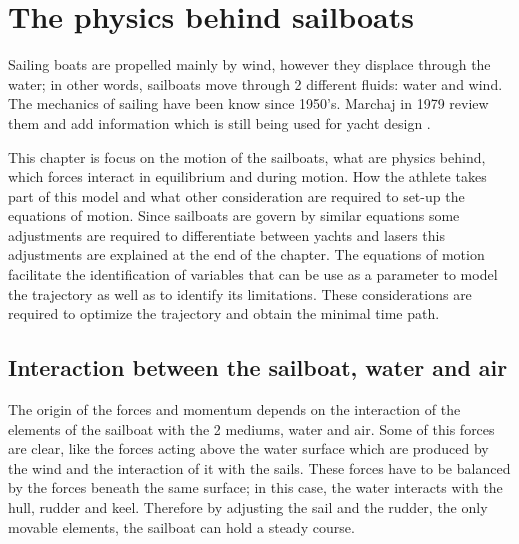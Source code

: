 \chapter{The physics behind sailboats}
Sailing boats are propelled mainly by wind, however they displace through the water; in other words, sailboats move through 2 different fluids: water and wind. The mechanics of sailing have been know since 1950's.  Marchaj in 1979 review them and add information which is still being used for yacht design \cite{marchajaereo1979}.\par 

This chapter is focus on the motion of the sailboats, what are physics behind, which forces interact in equilibrium and during motion. How the athlete takes part of this model and what other consideration are required to set-up the equations of motion. Since sailboats are govern by similar equations some adjustments are required to differentiate between yachts and lasers this adjustments are explained at the end of the chapter. The equations of motion facilitate the identification of variables that can be use as a parameter to model the trajectory as well as to identify its limitations. These considerations are required to optimize the trajectory and obtain the minimal time path. \par
\section{Interaction between the sailboat, water and air}
The origin of the forces and momentum depends on the interaction of the elements of the sailboat with the 2 mediums, water and air. Some of this forces are clear, like the forces acting above the water surface which are produced by the wind and the interaction of it with the sails. These forces have to be balanced by the forces beneath the same surface; in this case, the water interacts with the hull, rudder and keel. Therefore by adjusting the sail and the rudder, the only movable elements, the sailboat can hold a steady course.\par

